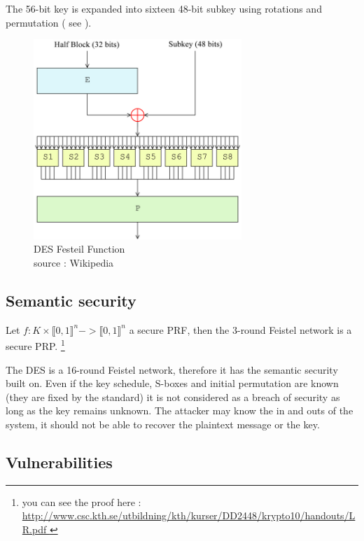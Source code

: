 The 56-bit key is expanded into sixteen 48-bit subkey using rotations and permutation ( see \cite{DES-wikipedia} ).

\begin{figure}[ht!]
    \centering
       \includegraphics[width=0.7\textwidth]{images/DES-f-function.png}
    \caption{DES Festeil Function \\ source : Wikipedia}
	\label{fig:DES-f-function}
\end{figure}

\subsection{ Semantic security }

\begin{mytheorem}
    Let $f:K\times\llbracket0,1\rrbracket^n -> \llbracket0,1\rrbracket^n$ a secure PRF, then the 3-round Feistel network is a secure PRP. \footnote{ you can see the proof here : \url{http://www.csc.kth.se/utbildning/kth/kurser/DD2448/krypto10/handouts/LR.pdf }}
\end{mytheorem}

The DES is a 16-round Feistel network, therefore it has the semantic security built on.  Even if the key schedule, S-boxes and initial permutation are known (they are fixed by the standard) it is not considered as a breach of security as long as the key remains unknown. The attacker may know the in and outs of the system, it should not be able to recover the plaintext message or the key.

\subsection{ Vulnerabilities }

